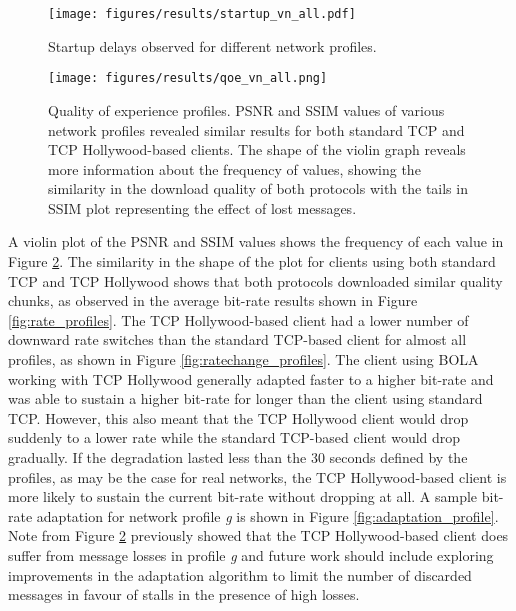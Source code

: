 \begin{figure}
  \centering
  \texttt{[image: figures/results/startup\_vn\_all.pdf]}
  \caption{Startup delays observed for different network profiles. }
  \label{fig:startup_profiles}
\end{figure}




\begin{figure}
  \centering
  \texttt{[image: figures/results/qoe\_vn\_all.png]}
  \caption{Quality of experience profiles. PSNR and SSIM values of various network profiles 
           revealed similar results for both standard TCP and TCP Hollywood-based clients. The 
           shape of the violin graph reveals more information about the frequency of values, 
           showing the similarity in the download quality of both protocols with the tails in 
           SSIM plot representing the effect of lost messages.}
  \label{fig:qoe_profiles}
\end{figure}

A violin plot of the PSNR and SSIM values shows the frequency of each value in Figure 
\ref{fig:qoe_profiles}. The similarity in the shape of the plot for clients using both 
standard TCP and TCP Hollywood shows that both protocols downloaded similar quality chunks, 
as observed in the average bit-rate results shown in Figure \ref{fig:rate_profiles}. The TCP Hollywood-based client had 
a lower number of downward rate switches than the standard TCP-based client for almost all 
profiles, as shown in Figure \ref{fig:ratechange_profiles}. The client using BOLA working
with TCP Hollywood generally adapted faster to a higher bit-rate and was able to sustain a
higher bit-rate for longer than the client using standard TCP. However, this also meant that 
the TCP Hollywood client would drop suddenly to a lower rate while the standard TCP-based 
client would drop
gradually. If the degradation lasted less than the 30 seconds defined by the profiles, as
may be the case for real networks, the TCP Hollywood-based client is more likely to sustain 
the current bit-rate without dropping at all. A sample bit-rate adaptation for network profile 
\emph{g} is shown in Figure \ref{fig:adaptation_profile}. Note from Figure \ref{fig:qoe_profiles}
previously showed that the TCP Hollywood-based client does suffer from message losses in profile 
\emph{g} and future work should include exploring improvements in the adaptation algorithm to 
limit the number of discarded messages in favour of stalls in the presence of high losses. 

